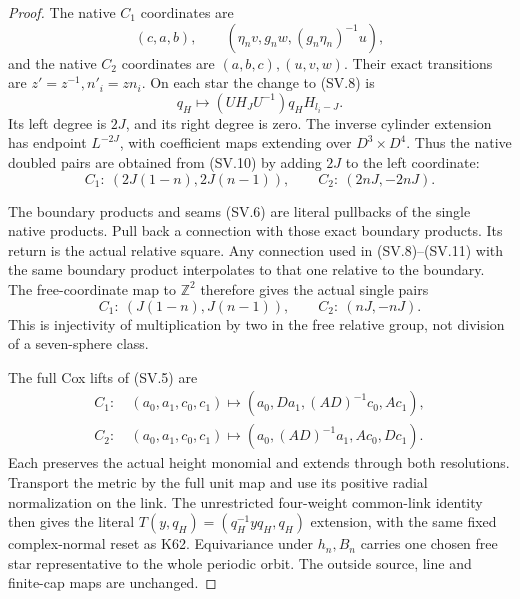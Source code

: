 \begin{proof}
The native \(C_1\) coordinates are
\[
 (c,a,b),\qquad
       (\eta_n v,g_nw,(g_n\eta_n)^{-1}u),
\]
and the native \(C_2\) coordinates are
\((a,b,c),(u,v,w)\). Their exact transitions are
\(z'=z^{-1},n'_i=zn_i\). On each star the change
to (SV.8) is
\[
                q_H\mapsto
                   (UH_JU^{-1})q_HH_{l_i-J}.         \tag{SV.11}
\]
Its left degree is \(2J\), and its right degree
is zero. The inverse cylinder extension has
endpoint \(L^{-2J}\), with coefficient maps
extending over \(D^3\times D^4\). Thus the native
doubled pairs are obtained from (SV.10) by adding
\(2J\) to the left coordinate:
\[
 C_1:\ (2J(1-n),2J(n-1)),\qquad
 C_2:\ (2nJ,-2nJ).                                   \tag{SV.12}
\]

The boundary products and seams (SV.6) are literal
pullbacks of the single native products. Pull back
a connection with those exact boundary products.
Its return is the actual relative square. Any
connection used in (SV.8)--(SV.11) with the same
boundary product interpolates to that one relative
to the boundary. The free-coordinate map to
\(\mathbb Z^2\) therefore gives the actual single
pairs
\[
 C_1:\ (J(1-n),J(n-1)),\qquad
 C_2:\ (nJ,-nJ).                                     \tag{SV.13}
\]
This is injectivity of multiplication by two in
the free relative group, not division of a
seven-sphere class.

The full Cox lifts of (SV.5) are
\[
 \begin{aligned}
 C_1:\ &(a_0,a_1,c_0,c_1)
       \mapsto(a_0,Da_1,(AD)^{-1}c_0,Ac_1),\\
 C_2:\ &(a_0,a_1,c_0,c_1)
       \mapsto(a_0,(AD)^{-1}a_1,Ac_0,Dc_1).
 \end{aligned}                                          \tag{SV.14}
\]
Each preserves the actual height monomial and
extends through both resolutions. Transport the
metric by the full unit map and use its positive
radial normalization on the link. The unrestricted
four-weight common-link identity then gives the
literal \(T(y,q_H)=(q_H^{-1}yq_H,q_H)\) extension,
with the same fixed complex-normal reset as K62.
Equivariance under \(h_n,B_n\) carries one chosen
free star representative to the whole periodic
orbit. The outside source, line and finite-cap
maps are unchanged.


\end{proof}
